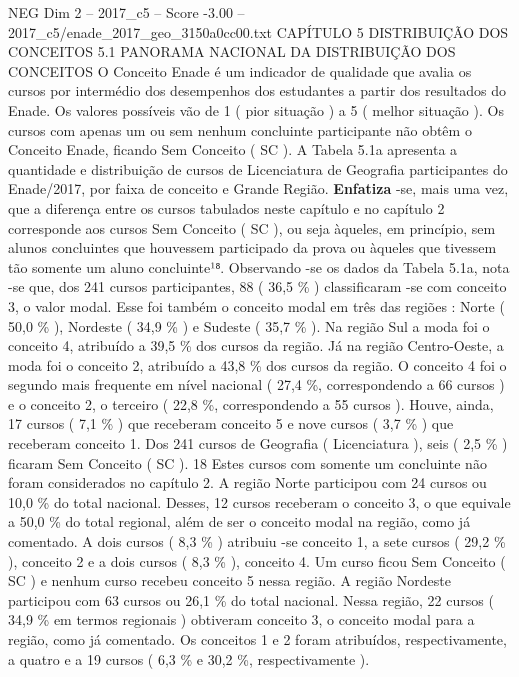\begin{textsample}{NEG Dim 2 – 2017\_c5 – Score -3.00 – 2017\_c5/enade\_2017\_geo\_3150a0cc00.txt}  \label{ex:f2_neg_042}
CAPÍTULO 5 DISTRIBUIÇÃO DOS CONCEITOS 5.1 PANORAMA NACIONAL DA DISTRIBUIÇÃO DOS CONCEITOS O Conceito Enade é um indicador de qualidade que avalia os cursos por intermédio dos desempenhos dos estudantes a partir dos resultados do Enade.
Os valores possíveis vão de 1 ( pior situação ) a 5 ( melhor situação ).
Os cursos com apenas um ou sem nenhum concluinte participante não obtêm o Conceito Enade, ficando Sem Conceito ( SC ).
A Tabela 5.1a apresenta a quantidade e distribuição de cursos de Licenciatura de Geografia participantes do Enade/2017, por faixa de conceito e Grande Região. \textbf{Enfatiza} -se, mais uma vez, que a diferença entre os cursos tabulados neste capítulo e no capítulo 2 corresponde aos cursos Sem Conceito ( SC ), ou seja àqueles, em princípio, sem alunos concluintes que houvessem participado da prova ou àqueles que tivessem tão somente um aluno concluinte¹⁸.
Observando -se os dados da Tabela 5.1a, nota -se que, dos 241 cursos participantes, 88 ( 36,5 \% ) classificaram -se com conceito 3, o valor modal.
Esse foi também o conceito modal em três das regiões : Norte ( 50,0 \% ), Nordeste ( 34,9 \% ) e Sudeste ( 35,7 \% ).
Na região Sul a moda foi o conceito 4, atribuído a 39,5 \% dos cursos da região.
Já na região Centro-Oeste, a moda foi o conceito 2, atribuído a 43,8 \% dos cursos da região.
O conceito 4 foi o segundo mais frequente em nível nacional ( 27,4 \%, correspondendo a 66 cursos ) e o conceito 2, o terceiro ( 22,8 \%, correspondendo a 55 cursos ).
Houve, ainda, 17 cursos ( 7,1 \% ) que receberam conceito 5 e nove cursos ( 3,7 \% ) que receberam conceito 1.
Dos 241 cursos de Geografia ( Licenciatura ), seis ( 2,5 \% ) ficaram Sem Conceito ( SC ). 18 Estes cursos com somente um concluinte não foram considerados no capítulo 2.
A região Norte participou com 24 cursos ou 10,0 \% do total nacional.
Desses, 12 cursos receberam o conceito 3, o que equivale a 50,0 \% do total regional, além de ser o conceito modal na região, como já comentado.
A dois cursos ( 8,3 \% ) atribuiu -se conceito 1, a sete cursos ( 29,2 \% ), conceito 2 e a dois cursos ( 8,3 \% ), conceito 4.
Um curso ficou Sem Conceito ( SC ) e nenhum curso recebeu conceito 5 nessa região.
A região Nordeste participou com 63 cursos ou 26,1 \% do total nacional.
Nessa região, 22 cursos ( 34,9 \% em termos regionais ) obtiveram conceito 3, o conceito modal para a região, como já comentado.
Os conceitos 1 e 2 foram atribuídos, respectivamente, a quatro e a 19 cursos ( 6,3 \% e 30,2 \%, respectivamente ).

\end{textsample}
